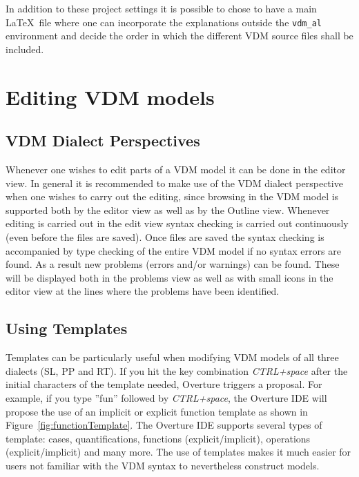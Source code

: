 \documentclass{overturerep}
\begin{document}
{In addition to these project settings it is possible to chose to have
a main \LaTeX\ file where one can incorporate the explanations outside
the \texttt{vdm\_al} environment and decide the order in which the
different VDM source files shall be included. 

\section{Editing VDM models}\label{sec:editVDM}

\subsection{VDM Dialect Perspectives}

Whenever one wishes to edit parts of a VDM model it can be done in the
editor view. In general it is recommended to make use of the VDM
dialect perspective when one wishes to carry out the editing, since
browsing in the VDM model is supported both by the editor view as well
as by the Outline view. Whenever editing is carried out in the edit
view syntax checking is carried out continuously (even before the
files are saved). Once files are saved the syntax checking is
accompanied by type checking of the entire VDM model if no syntax
errors are found. As a result new
problems (errors and/or warnings) can be found. These will be
displayed both in the problems view as well as with small icons in the
editor view at the lines where the problems have been identified.

\subsection{Using Templates}

Templates can be particularly useful when modifying VDM models of all 
three dialects (SL, PP and RT). If you hit
the key combination \textit{CTRL+space} after the initial characters
of the template needed, Overture triggers a proposal. For example, if
you type ''fun'' followed by \textit{CTRL+space}, the Overture IDE
will propose the use of an implicit or explicit function template as
shown in Figure~\ref{fig:functionTemplate}. The Overture IDE
supports several types of template: cases, quantifications, functions
(explicit/implicit), operations (explicit/implicit) and many
more. The use
of templates makes it much easier for users not familiar
with the VDM syntax to nevertheless construct models.

}
\end{document}
